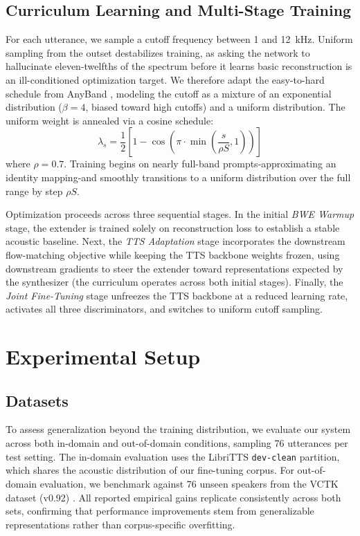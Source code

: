 \documentclass{article}
\begin{document}
\subsection{Curriculum Learning and Multi-Stage Training}
For each utterance, we sample a cutoff frequency between 1 and 12~kHz. Uniform sampling from the outset destabilizes training, as asking the network to hallucinate eleven-twelfths of the spectrum before it learns basic reconstruction is an ill-conditioned optimization target. We therefore adapt the easy-to-hard schedule from AnyBand \cite{anyband}, modeling the cutoff as a mixture of an exponential distribution ($\beta = 4$, biased toward high cutoffs) and a uniform distribution. The uniform weight is annealed via a cosine schedule:
\begin{equation}
\lambda_s = \frac{1}{2} \left[1 - \cos\left(\pi \cdot \min\left(\frac{s}{\rho S}, 1\right)\right)\right]
\end{equation}
where $\rho = 0.7$. Training begins on nearly full-band prompts-approximating an identity mapping-and smoothly transitions to a uniform distribution over the full range by step $\rho S$.

Optimization proceeds across three sequential stages. In the initial \textit{BWE Warmup} stage, the extender is trained solely on reconstruction loss to establish a stable acoustic baseline. Next, the \textit{TTS Adaptation} stage incorporates the downstream flow-matching objective while keeping the TTS backbone weights frozen, using downstream gradients to steer the extender toward representations expected by the synthesizer (the curriculum operates across both initial stages). Finally, the \textit{Joint Fine-Tuning} stage unfreezes the TTS backbone at a reduced learning rate, activates all three discriminators, and switches to uniform cutoff sampling.

\section{Experimental Setup}

\subsection{Datasets}
To assess generalization beyond the training distribution, we evaluate our system across both in-domain and out-of-domain conditions, sampling 76 utterances per test setting. The in-domain evaluation uses the LibriTTS \cite{libritts} \texttt{dev-clean} partition, which shares the acoustic distribution of our fine-tuning corpus. For out-of-domain evaluation, we benchmark against 76 unseen speakers from the VCTK dataset (v0.92) \cite{vctk}. All reported empirical gains replicate consistently across both sets, confirming that performance improvements stem from generalizable representations rather than corpus-specific overfitting.
\end{document}
